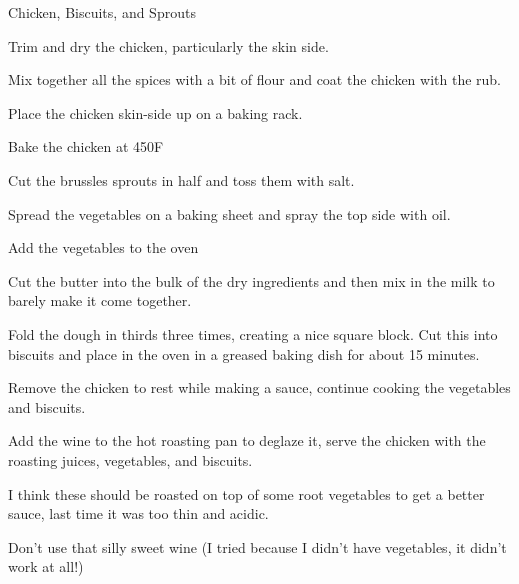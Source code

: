 \documentclass{recipe}
\begin{document}
\begin{recipe}{Chicken, Biscuits, and Sprouts}
  \begin{steps}
  \item Trim and dry the chicken, particularly the skin side.
  \item Mix together all the spices with a bit of flour and coat the
    chicken with the rub.
  \item Place the chicken skin-side up on a baking rack.
  \item Bake the chicken at 450\degree F
  \item Cut the brussles sprouts in half and toss them with salt.
  \item Spread the vegetables on a baking sheet and spray the top side
    with oil.
  \item Add the vegetables to the oven
  \item Cut the butter into the bulk of the dry ingredients and then
    mix in the milk to barely make it come together.
  \item Fold the dough in thirds three times, creating a nice square
    block.  Cut this into biscuits and place in the oven in a greased
    baking dish for about 15 minutes.
  \item Remove the chicken to rest while making a sauce, continue
    cooking the vegetables and biscuits.
  \item Add the wine to the hot roasting pan to deglaze it, serve the
    chicken with the roasting juices, vegetables, and biscuits.
  \end{steps}

  \begin{notes}
  \item I think these should be roasted on top of some root vegetables to
    get a better sauce, last time it was too thin and acidic.
  \item Don't use that silly sweet wine (I tried because I didn't have
    vegetables, it didn't work at all!)
  \end{notes}
\end{recipe}
\end{document}
